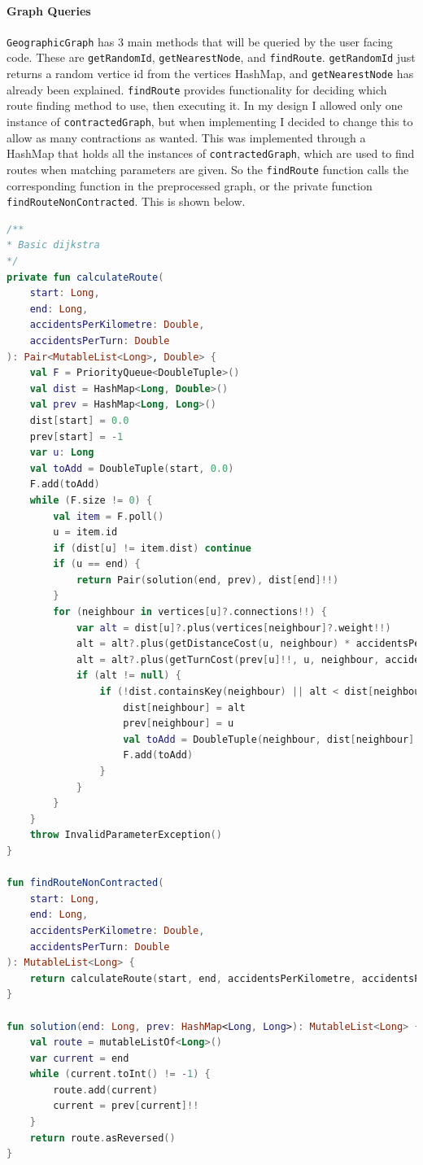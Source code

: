 \documentclass[11pt,twoside,a4paper]{article}
\begin{document}
\paragraph{Graph Queries}
\texttt{GeographicGraph} has 3 main methods that will be queried by the user facing code. These are \texttt{getRandomId}, \texttt{getNearestNode}, and \texttt{findRoute}. \texttt{getRandomId} just returns a random vertice id from the vertices HashMap, and \texttt{getNearestNode} has already been explained.
\texttt{findRoute} provides functionality for deciding which route finding method to use, then executing it. In my design I allowed only one instance of \texttt{contractedGraph}, but when implementing I decided to change this to allow as many contractions as wanted. This was implemented through a HashMap that holds all the instances of \texttt{contractedGraph}, which are used to find routes when matching parameters are given. 
So the \texttt{findRoute} function calls the corresponding function in the preprocessed graph, or the private function \texttt{findRouteNonContracted}. This is shown below.
\begin{lstlisting}[language=kotlin]
/**
* Basic dijkstra
*/
private fun calculateRoute(
    start: Long,
    end: Long,
    accidentsPerKilometre: Double,
    accidentsPerTurn: Double
): Pair<MutableList<Long>, Double> {
    val F = PriorityQueue<DoubleTuple>()
    val dist = HashMap<Long, Double>()
    val prev = HashMap<Long, Long>()
    dist[start] = 0.0
    prev[start] = -1
    var u: Long
    val toAdd = DoubleTuple(start, 0.0)
    F.add(toAdd)
    while (F.size != 0) {
        val item = F.poll()
        u = item.id
        if (dist[u] != item.dist) continue
        if (u == end) {
            return Pair(solution(end, prev), dist[end]!!)
        }
        for (neighbour in vertices[u]?.connections!!) {
            var alt = dist[u]?.plus(vertices[neighbour]?.weight!!)
            alt = alt?.plus(getDistanceCost(u, neighbour) * accidentsPerKilometre)
            alt = alt?.plus(getTurnCost(prev[u]!!, u, neighbour, accidentsPerTurn))
            if (alt != null) {
                if (!dist.containsKey(neighbour) || alt < dist[neighbour]!!) {
                    dist[neighbour] = alt
                    prev[neighbour] = u
                    val toAdd = DoubleTuple(neighbour, dist[neighbour]!!)
                    F.add(toAdd)
                }
            }
        }
    }
    throw InvalidParameterException()
}

fun findRouteNonContracted(
    start: Long,
    end: Long,
    accidentsPerKilometre: Double,
    accidentsPerTurn: Double
): MutableList<Long> {
    return calculateRoute(start, end, accidentsPerKilometre, accidentsPerTurn).first
}

fun solution(end: Long, prev: HashMap<Long, Long>): MutableList<Long> {
    val route = mutableListOf<Long>()
    var current = end
    while (current.toInt() != -1) {
        route.add(current)
        current = prev[current]!!
    }
    return route.asReversed()
}
\end{lstlisting}
\end{document}
